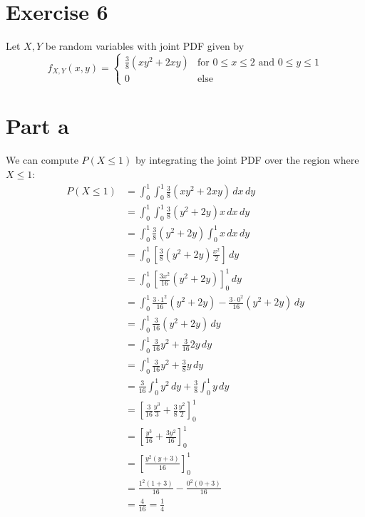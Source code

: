\section{Exercise 6}
Let $X,Y$ be random variables with joint PDF given by
\[
	f_{X,Y}(x,y) =  \begin{cases}
		\frac{3}{8}(xy^2+2xy) & \text{for } 0 \leq x \leq 2 \text{ and } 0 \leq y \leq 1 \\
		0                     & \text{else}
	\end{cases}
\]

\section{Part a}

We can compute $P(X\leq 1)$ by integrating the joint PDF over the region where $X\leq 1$:
\begin{align*}
	P(X\leq 1) & = \int_{0}^{1}\int_{0}^{1} \frac{3}{8}(xy^2+2xy) \,dx\,dy                        \\
	           & = \int_{0}^{1}\int_{0}^{1} \frac{3}{8}(y^2+2y)x \,dx\,dy                         \\
	           & = \int_{0}^{1} \frac{3}{8}(y^2+2y)\int_{0}^{1}x \,dx\,dy                         \\
	           & = \int_{0}^{1} \left[\frac{3}{8}(y^2+2y)\frac{x^2}{2} \right]\,dy                \\
	           & = \int_{0}^{1} \left[\frac{3x^2}{16}(y^2+2y) \right]^1_0\,dy                     \\
	           & = \int_{0}^{1} \frac{3\cdot 1^2}{16}(y^2+2y) - \frac{3\cdot 0^2}{16}(y^2+2y)\,dy \\
	           & = \int_{0}^{1} \frac{3}{16}(y^2+2y)\,dy                                          \\
	           & = \int_{0}^{1} \frac{3}{16}y^2+\frac{3}{16}2y\,dy                                \\
	           & = \int_{0}^{1} \frac{3}{16}y^2+\frac{3}{8}y\,dy                                  \\
	           & = \frac{3}{16}\int_{0}^{1} y^2\,dy+\frac{3}{8}\int_{0}^{1} y\,dy                 \\
	           & = \left[\frac{3}{16}\frac{y^3}{3} + \frac{3}{8}\frac{y^2}{2}\right]^1_0          \\
	           & = \left[\frac{y^3}{16} + \frac{3y^2}{16}\right]^1_0                              \\
	           & = \left[\frac{y^2\left(y + 3\right)}{16}\right]^1_0                              \\
	           & = \frac{1^2\left(1 + 3\right)}{16} - \frac{0^2\left(0 + 3\right)}{16}            \\
	           & = \frac{4}{16}  = \frac{1}{4}                                                    \\
\end{align*}
